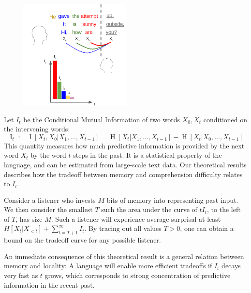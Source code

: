 \documentclass[11pt,letterpaper]{article}
\begin{document}
\begin{figure}
\includegraphics[width=0.5\textwidth]{figures-gdrive/mi-distance.png}
	\caption{}\label{fig:results}
\end{figure}


Let $I_t$ be the Conditional Mutual Information of two words $X_0, X_t$ conditioned on the intervening words:
\begin{equation}
	\operatorname{I}_t := \operatorname{I}[X_t, X_0 | X_1, \dots, X_{t-1}] = \operatorname{H}[X_t|X_1, \dots, X_{t-1}] - \operatorname{H}[X_t|X_0, \dots, X_{t-1}] 
\end{equation}
This quantity measures how much predictive information is provided by the next word $X_t$ by the word $t$ steps in the past.
It is a statistical property of the language, and can be estimated from large-scale text data.
Our theoretical results describes how the tradeoff between memory and comprehension difficulty relates to $I_t$.

Consider a listener who invests $M$ bits of memory into representing past input.
We then consider the smallest $T$ such the area under the curve of $t I_t$, to the left of $T$, has size $M$.
Such a listener will experience average surprisal at least $H[X_t| X_{<t}] + \sum_{t=T+1}^\infty I_t$.
By tracing out all values $T >0$, one can obtain a bound on the tradeoff curve for any possible listener.


An immediate consequence of this theoretical result is a general relation between memory and locality:
A language will enable more efficient tradeoffs if $I_t$ decays very fast as $t$ grows, which corresponds to strong concentration of predictive information in the recent past.

\end{document}
